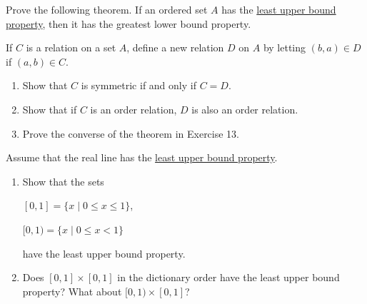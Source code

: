   \begin{exercise}[Munkres 3.13]
    Prove the following theorem. If an ordered set $A$ has the \hyperref[real-def:least-upper-bound-property]{least upper bound property}, then it has the greatest lower bound property.
  \end{exercise}
  \begin{solution}
    
  \end{solution}

  \begin{exercise}[Munkres 3.14]
    If $C$ is a relation on a set $A$, define a new relation $D$ on $A$ by letting $(b, a) \in D$ if $(a, b) \in C$.
    \begin{enumerate}
      \item Show that $C$ is symmetric if and only if $C = D$.
      \item Show that if $C$ is an order relation, $D$ is also an order relation.
      \item Prove the converse of the theorem in Exercise 13.
    \end{enumerate}
  \end{exercise}
  \begin{solution}
    
  \end{solution}

  \begin{exercise}[Munkres 3.15]
    Assume that the real line has the \hyperref[real-def:least-upper-bound-property]{least upper bound property}.
    \begin{enumerate}
      \item Show that the sets

      $[0, 1] = \{x \mid 0 \leq x \leq 1\}$,

      $[0, 1) = \{x \mid 0 \leq x < 1\}$

      have the least upper bound property.
      \item Does $[0, 1] \times [0, 1]$ in the dictionary order have the least upper bound property? What about $[0, 1) \times [0, 1]$?
    \end{enumerate}
  \end{exercise}
  \begin{solution}
    
  \end{solution}
  
